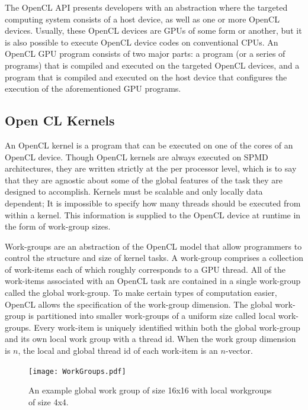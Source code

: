 \documentclass[12pt,twoside]{reedthesis}
\begin{document}
The OpenCL API presents developers with an abstraction where the targeted computing system consists of a host device, as well as one or more OpenCL devices. Usually, these OpenCL devices are GPUs of some form or another, but it is also possible to execute OpenCL device codes on conventional CPUs. An OpenCL GPU program consists of two major parts: a program (or a series of programs) that is compiled and executed on the targeted OpenCL devices, and a program that is compiled and executed on the host device that configures the execution of the aforementioned GPU programs.

\subsection{Open CL Kernels}
\label{Kernels}

An OpenCL kernel is a program that can be executed on one of the cores of an OpenCL device. Though OpenCL kernels are always executed on SPMD architectures, they are written strictly at the per processor level, which is to say that they are agnostic about some of the global features of the task they are designed to accomplish. Kernels must be scalable and only locally data dependent; It is impossible to specify how many threads should be executed from within a kernel. This information is supplied to the OpenCL device at runtime in the form of work-group sizes. 

Work-groups are an abstraction of the OpenCL model that allow programmers to control the structure and size of kernel tasks. A work-group comprises a collection of work-items each of which roughly corresponds to a GPU thread. All of the work-items associated with an OpenCL task are contained in a single work-group called the global work-group. To make certain types of computation easier, OpenCL allows the specification of the work-group dimension. The global work-group is partitioned into smaller work-groups of a uniform size called local work-groups. Every work-item is uniquely identified within both the global work-group and its own local work group with a thread id. When the work group dimension is $n$, the local and global thread id of each work-item is an $n$-vector.

\begin{figure}[h!]
\begin{center}
\texttt{[image: WorkGroups.pdf]}
\end{center}
\caption{An example global work group of size 16x16 with local workgroups of size 4x4.}
\end{figure}
\label{workgroups}
\vspace{1pc}
\end{document}
